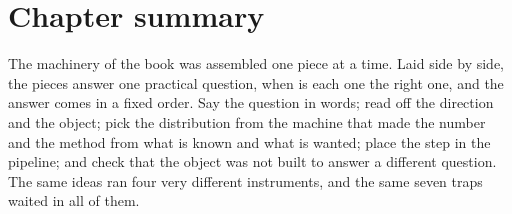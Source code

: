\section*{Chapter summary}

The machinery of the book was assembled one piece at a time. Laid side by side, the
pieces answer one practical question, when is each one the right one, and the answer
comes in a fixed order. Say
the question in words; read off the direction and the object; pick the distribution
from the machine that made the number and the method from what is known and what is
wanted; place the step in the pipeline; and check that the object was not built to
answer a different question. The same ideas ran four very different instruments, and
the same seven traps waited in all of them.

